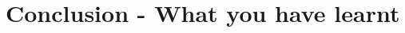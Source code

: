 \documentclass{42-en}
\begin{document}

\newpage

\newpage

\newpage

\newpage

\newpage

\newpage

\newpage

\newpage

\newpage

\newpage
\chapter{Conclusion - What you have learnt}
\end{document}
